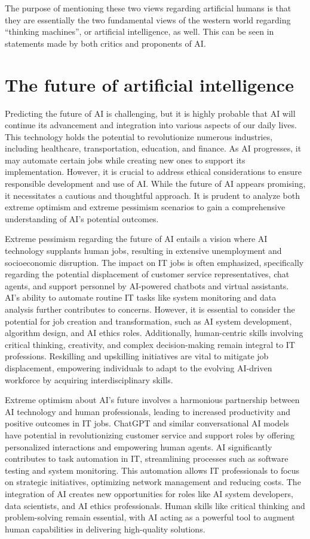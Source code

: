 The purpose of mentioning these two views regarding artificial humans is that they are essentially the 
two fundamental views of the western world regarding “thinking machines”, or artificial intelligence, 
as well. This can be seen in statements made by both critics and proponents of AI. \cite{Denkmaschinen}
\newpage
\section{The future of artificial intelligence}

Predicting the future of AI is challenging, but it is highly probable that AI will continue its advancement and 
integration into various aspects of our daily lives. This technology holds the potential to revolutionize numerous 
industries, including healthcare, transportation, education, and finance. As AI progresses, it may automate certain 
jobs while creating new ones to support its implementation. However, it is crucial to address ethical considerations 
to ensure responsible development and use of AI. While the future of AI appears promising, it necessitates a cautious 
and thoughtful approach. It is prudent to analyze both extreme optimism and extreme pessimism scenarios to gain a 
comprehensive understanding of AI's potential outcomes.

Extreme pessimism regarding the future of AI entails a vision where AI technology supplants human jobs, 
resulting in extensive unemployment and socioeconomic disruption. The impact on IT jobs is often emphasized, 
specifically regarding the potential displacement of customer service representatives, chat agents, and support 
personnel by AI-powered chatbots and virtual assistants. AI's ability to automate routine IT tasks like system monitoring 
and data analysis further contributes to concerns. However, it is essential to consider the potential for job creation and 
transformation, such as AI system development, algorithm design, and AI ethics roles. Additionally, human-centric skills 
involving critical thinking, creativity, and complex decision-making remain integral to IT professions. Reskilling and upskilling 
initiatives are vital to mitigate job displacement, empowering individuals to adapt to the evolving AI-driven workforce 
by acquiring interdisciplinary skills.

Extreme optimism about AI's future involves a harmonious partnership between AI technology and human 
professionals, leading to increased productivity and positive outcomes in IT jobs. ChatGPT and similar 
conversational AI models have potential in revolutionizing customer service and support roles by offering 
personalized interactions and empowering human agents. AI significantly contributes to task automation in IT, 
streamlining processes such as software testing and system monitoring. This automation allows IT professionals to 
focus on strategic initiatives, optimizing network management and reducing costs. The integration of AI creates new 
opportunities for roles like AI system developers, data scientists, and AI ethics professionals. Human skills like critical 
thinking and problem-solving remain essential, with AI acting as a powerful tool to augment human capabilities in delivering high-quality solutions.

